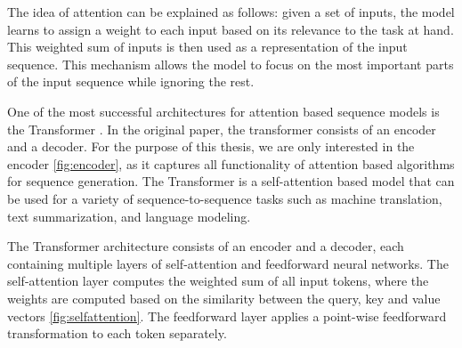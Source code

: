The idea of attention can be explained as follows: given a set of inputs, the model learns to assign a weight to each input based on its relevance to the 
task at hand.
This weighted sum of inputs is then used as a representation of the input sequence. This mechanism allows the model to focus on the most important 
parts of the input sequence while ignoring the rest.

One of the most successful architectures for attention based sequence models is the Transformer \cite{vaswani2017attention}. In the original paper, the transformer 
consists of an encoder and a decoder. For the purpose of this thesis, we are only interested in the encoder \ref{fig:encoder}, as it captures all functionality of attention based 
algorithms for sequence generation. 
The Transformer is a self-attention based model that can be used for a variety of sequence-to-sequence tasks such as machine translation,
text summarization, and language modeling.

The Transformer architecture consists of an encoder and a decoder, each containing multiple layers of self-attention and feedforward neural networks. 
The self-attention layer computes the weighted sum of all input tokens, where the weights are computed based on the similarity between the query, key and value
vectors \ref{fig:selfattention}.
The feedforward layer applies a point-wise feedforward transformation to each token separately.

